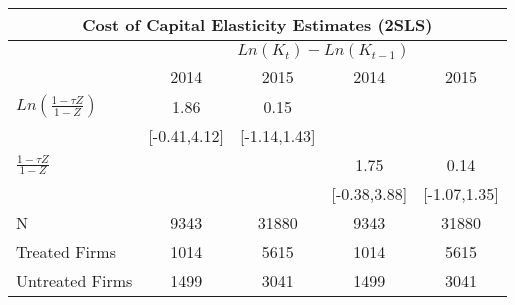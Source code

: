 \begin{tabular}{lcccc}
\multicolumn{5}{c}{Cost of Capital Elasticity Estimates (2SLS)} \\ \midrule
                    &\multicolumn{4}{c}{$ Ln(K_t) - Ln(K_{t-1})$}                   \\\cmidrule(lr){2-5}
                    &        2014   &        2015   &        2014   &        2015   \\
\midrule
$  Ln(\frac{1-\tau Z}{1-Z}) $&        1.86   &        0.15   &               &               \\
                    &[-0.41,4.12]   &[-1.14,1.43]   &               &               \\
\addlinespace
$  \frac{1-\tau Z}{1-Z} $&               &               &        1.75   &        0.14   \\
                    &               &               &[-0.38,3.88]   &[-1.07,1.35]   \\
\addlinespace
\midrule
N                   &        9343   &       31880   &        9343   &       31880   \\
Treated Firms       &        1014   &        5615   &        1014   &        5615   \\
Untreated Firms     &        1499   &        3041   &        1499   &        3041   \\
\bottomrule
\end{tabular}
